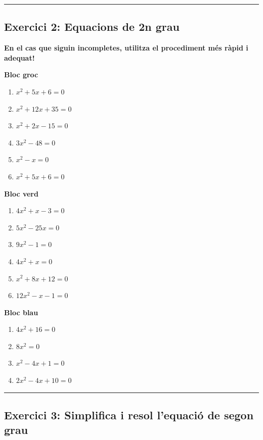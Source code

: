 \documentclass[11pt,a4paper]{article}
\begin{document}
\bigskip\hrule\bigskip

\subsection*{Exercici 2: Equacions de 2n grau}
\textbf{En el cas que siguin incompletes, utilitza el procediment més ràpid i adequat!}

\begin{blocgroc}
\textbf{Bloc groc}
\begin{enumerate}[label=\alph*), start=1]
\item $x^2 + 5x + 6 = 0$
\item $x^2 + 12x + 35 = 0$
\item $x^2 + 2x - 15 = 0$
\item $3x^2 - 48 = 0$
\item $x^2 - x = 0$
\item $x^2 + 5x + 6 = 0$
\end{enumerate}
\end{blocgroc}

\begin{blocverd}
\textbf{Bloc verd}
\begin{enumerate}[label=\alph*), start=7]
\item $4x^2 + x - 3 = 0$
\item $5x^2 - 25x = 0$
\item $9x^2 - 1 = 0$
\item $4x^2 + x = 0$
\item $x^2 + 8x + 12 = 0$
\item $12x^2 - x - 1 = 0$
\end{enumerate}
\end{blocverd}

\begin{blocblau}
\textbf{Bloc blau}
\begin{enumerate}[label=\alph*), start=13]
\item $4x^2 + 16 = 0$
\item $8x^2 = 0$
\item $x^2 - 4x + 1 = 0$
\item $2x^2 - 4x + 10 = 0$
\end{enumerate}
\end{blocblau}

\bigskip\hrule\bigskip

\subsection*{Exercici 3: Simplifica i resol l'equació de segon grau}
\end{document}
